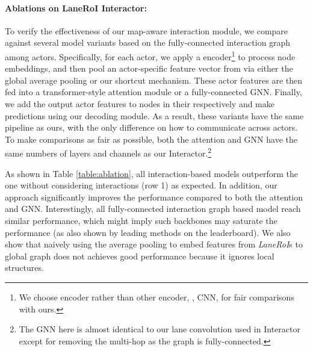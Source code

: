 \paragraph{Ablations on LaneRoI Interactor:}
To verify the effectiveness of our map-aware interaction module, we compare against several model variants based
on the fully-connected interaction graph among actors. Specifically, for each actor,
we apply a \ROI encoder\footnote{We choose \ROI encoder rather than other
encoder, \eg, CNN, for fair comparisons with ours.} to process node embeddings, and then pool an
actor-specific feature vector from \ROI via either the global average pooling or our
shortcut mechanism. These actor features are then fed into a transformer-style
\cite{transformer} attention module or a fully-connected GNN.
Finally, we add the output actor features to nodes in their \ROI respectively
and make predictions using our decoding module.
As a result, these variants have the same pipeline as ours, with the only
difference on how to communicate across actors. To make comparisons
as fair as possible, both the attention and GNN have the same
numbers of layers and channels as our \ROI Interactor.\footnote{The GNN here is almost identical to our lane
convolution used in Interactor except for removing the multi-hop as the graph is fully-connected.}

As shown in Table \ref{table:ablation}, all interaction-based models outperform
the one without considering interactions (row 1) as expected. In addition, our
approach significantly improves the performance compared to both the attention and GNN. 
Interestingly, all fully-connected interaction graph based model reach similar
performance, which might imply such backbones may saturate the performance (as
also shown by leading methods on the leaderboard).
We also show that naively using the average pooling to embed features from
\textit{LaneRoI}s to global graph does not achieves good performance
because it ignores local structures.






















